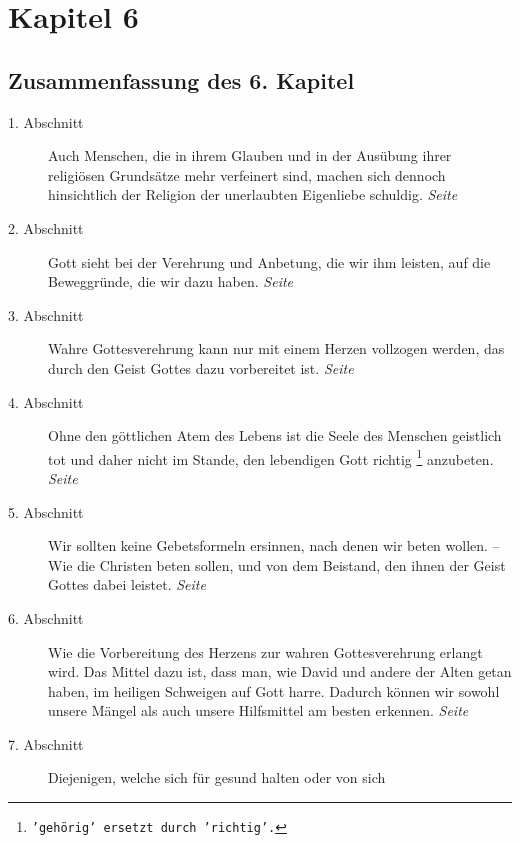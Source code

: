 

\chapter{Kapitel 6} \label{kap6}

\section{Zusammenfassung des 6. Kapitel}

\begin{description}
\item[1. Abschnitt] Auch Menschen, die in ihrem Glauben und in der Ausübung
ihrer religiösen Grundsätze mehr verfeinert sind, machen sich dennoch
hinsichtlich der Religion der unerlaubten Eigenliebe schuldig.
\dotfill \textit{Seite~\pageref{kap6_ab1}}\\
\item[2. Abschnitt] Gott sieht bei der Verehrung und Anbetung, die wir ihm
leisten, auf die Beweggründe, die wir dazu haben.
\dotfill \textit{Seite~\pageref{kap6_ab2}}\\
\item[3. Abschnitt] Wahre Gottesverehrung kann nur mit einem Herzen vollzogen
werden, das durch den Geist Gottes dazu vorbereitet ist.
\dotfill \textit{Seite~\pageref{kap6_ab3}}\\
\item[4. Abschnitt] Ohne den göttlichen Atem des Lebens ist die Seele des
Menschen geistlich tot und daher nicht im Stande, den lebendigen Gott richtig
\footnote{\texttt{'gehörig' ersetzt durch 'richtig'.}}
anzubeten.
\dotfill \textit{Seite~\pageref{kap6_ab4}}\\
\item[5. Abschnitt] Wir sollten keine Gebetsformeln ersinnen, nach denen wir
beten wollen. -- Wie die Christen beten sollen, und von dem Beistand, den ihnen
der Geist Gottes dabei leistet.
\dotfill \textit{Seite~\pageref{kap6_ab5}}\\
\item[6. Abschnitt] Wie die Vorbereitung des Herzens zur wahren Gottesverehrung
erlangt wird. Das Mittel dazu ist, dass man, wie David und andere der Alten
getan haben, im heiligen Schweigen auf Gott harre. Dadurch können wir sowohl
unsere Mängel als auch unsere Hilfsmittel am besten erkennen.
\dotfill \textit{Seite~\pageref{kap6_ab6}}\\
\item[7. Abschnitt] Diejenigen, welche sich für gesund halten oder von sich

\end{description}
